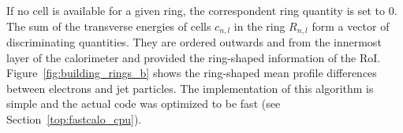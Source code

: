 



If no cell is available for a given ring, the correspondent ring
quantity is set to 0.
The sum of the transverse energies of cells $c_{n,l}$ in the ring $R_{n,l}$ form a vector of discriminating quantities. 
They are ordered outwards and from the
innermost layer of the calorimeter and provided the ring-shaped information 
of the RoI. Figure~\ref{fig:building_rings_b} shows the ring-shaped mean profile differences between electrons and jet particles. The implementation of this algorithm is simple and the actual code
was optimized to be fast (see Section~\ref{top:fastcalo_cpu}). 









%


